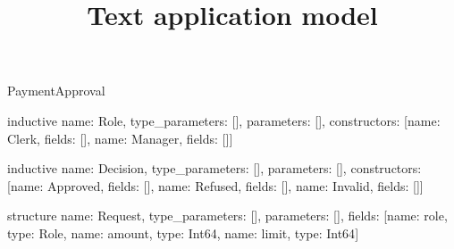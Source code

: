 \begin{lexlean}{PaymentApproval}
\title{Text application model}
\begin{semanticmodule}
inductive{
  name: Role,
  type_parameters: [],
  parameters: [],
  constructors: [{name: Clerk, fields: []}, {name: Manager, fields: []}]
}

inductive{
  name: Decision,
  type_parameters: [],
  parameters: [],
  constructors: [{name: Approved, fields: []}, {name: Refused, fields: []}, {name: Invalid, fields: []}]
}

structure{
  name: Request,
  type_parameters: [],
  parameters: [],
  fields: [{name: role, type: Role}, {name: amount, type: Int64}, {name: limit, type: Int64}]
}


\end{semanticmodule}
\end{lexlean}
